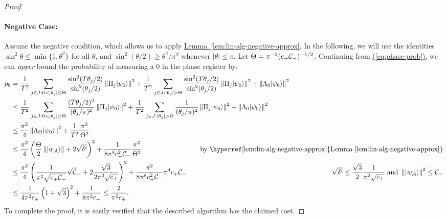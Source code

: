 \documentclass{article}
\newcommand{\eq}[1]{\hyperref[eq:#1]{(\ref*{eq:#1})}}
\newcommand{\lem}[1]{\hyperref[lem:#1]{Lemma~\ref*{lem:#1}}}
\def\ket#1{{\lvert}#1\rangle}
\renewcommand{\>}{\rangle}
\newcommand{\<}{\langle}
\renewcommand{\(}{\left(}
\renewcommand{\)}{\right)}
\def\norm#1{\left\| #1 \right\|}
\begin{document}
\begin{proof}
\paragraph{Negative Case:} Assume the negative condition, which allows us to apply \lem{lin-alg-negative-approx}. In the following, we will use the identities $\sin^2\theta\leq \min\{1,\theta^2\}$ for all $\theta$, and $\sin^2(\theta/2)\geq \theta^2/\pi^2$ whenever $|\theta|\leq \pi$. Let $\Theta = {\pi^{-2}({c_+{\cal C}_-})^{-1/2}}$.
Continuing from \eq{phase-prob}, 
we can \emph{upper} bound the probability of measuring a 0 in the phase register by:
\begin{align*}
p_0
&=\frac{1}{T^2}\sum_{j\in J:0<|\theta_j|\leq \Theta}\frac{\sin^2(T\theta_j/2)}{\sin^2(\theta_j/2)}\norm{\Pi_j\ket{\psi_0}}^2
+\frac{1}{T^2}\sum_{j\in J:|\theta_j|> \Theta}\frac{\sin^2(T\theta_j/2)}{\sin^2(\theta_j/2)}\norm{\Pi_j\ket{\psi_0}}^2+\norm{\Lambda_0\ket{\psi_0}}^2\!\!\!\!\!\!\!\!\!\!\!\!\!\!\!\!\!\!\!\!\!\!\!\!\!\!\!\!\!\!\!\!\!\!\!\!\!\!\!\!\!\!\!\!\!\!\!\!\!\!\!\!\!\!\!\!\!\!\!\!\!\!\!\!\!\!\!\!\!\!\!\!\!\!\!\!\!\!\!\!\!\!\!\!\\
&\leq \frac{1}{T^2}\sum_{j\in J:0<|\theta_j|\leq \Theta}\frac{(T\theta_j/2)^2}{(\theta_j/\pi)^2}\norm{\Pi_j\ket{\psi_0}}^2+\frac{1}{T^2}\sum_{j\in J:|\theta_j|>\Theta}\frac{1}{(\theta_j/\pi)^2}\norm{\Pi_j\ket{\psi_0}}^2+\norm{\Lambda_0\ket{\psi_0}}^2\!\!\!\!\!\!\!\!\!\!\!\!\!\!\!\!\!\!\!\!\!\!\!\!\!\!\!\!\!\!\!\!\!\!\!\!\!\!\!\!\!\!\!\!\!\!\!\!\!\!\!\!\!\!\!\!\!\!\!\!\!\!\!\!\!\!\!\!\!\!\!\!\!\!\\
&\leq \frac{\pi^2}{4}\norm{\Lambda_\Theta\ket{\psi_0}}^2+\frac{1}{T^2}\frac{\pi^2}{\Theta^2}\\
&\leq \frac{\pi^2}{4}\left(\frac{\Theta}{2}\norm{\ket{w_{\cal A}}}+2\sqrt{\delta'}\right)^2+\frac{1}{8\pi^8c_+^2{\cal C}_-}\frac{\pi^2}{\Theta^2} & \mbox{by \lem{lin-alg-negative-approx}}\\
&\leq \frac{\pi^2}{4}\left(\frac{1}{\pi^2\sqrt{c_+{\cal C}_-}}\sqrt{\cal C}_-+2\frac{\sqrt{3}}{2\pi^2\sqrt{c_+}}\right)^2 + \frac{\pi^2}{8\pi^8c_+^2{\cal C}_-}\pi^4 c_+{\cal C}_- & \sqrt{\delta'}\leq \frac{\sqrt{3}}{2}\frac{1}{\pi^2\sqrt{c_+}}\mbox{ and } \norm{\ket{w_{\cal A}}}^2\leq {\cal C}_-\\
&\leq \frac{1}{4\pi^2c_+}\left(1+\sqrt{3}\right)^2 + \frac{1}{8\pi^2c_+}
 \leq \frac{2}{\pi^2c_+}.
\end{align*}
To complete the proof, it is easily verified that the described algorithm has the claimed cost.
\end{proof}
\end{document}
